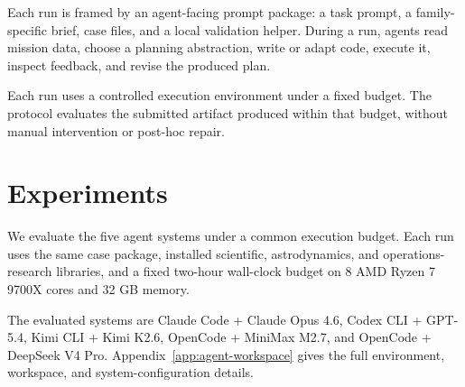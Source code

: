 \documentclass[11pt]{article}
\begin{document}
Each run is framed by an agent-facing prompt package: a task prompt, a family-specific brief, case files, and a local validation helper. During a run, agents read mission data, choose a planning abstraction, write or adapt code, execute it, inspect feedback, and revise the produced plan.

Each run uses a controlled execution environment under a fixed budget. The protocol evaluates the submitted artifact produced within that budget, without manual intervention or post-hoc repair.

\section{Experiments}
\label{sec:experiments}

We evaluate the five agent systems under a common execution budget. Each run uses the same case package, installed scientific, astrodynamics, and operations-research libraries, and a fixed two-hour wall-clock budget on 8 AMD Ryzen 7 9700X cores and 32 GB memory.

The evaluated systems are Claude Code + Claude Opus 4.6, Codex CLI + GPT-5.4, Kimi CLI + Kimi K2.6, OpenCode + MiniMax M2.7, and OpenCode + DeepSeek V4 Pro. Appendix~\ref{app:agent-workspace} gives the full environment, workspace, and system-configuration details.
\end{document}
